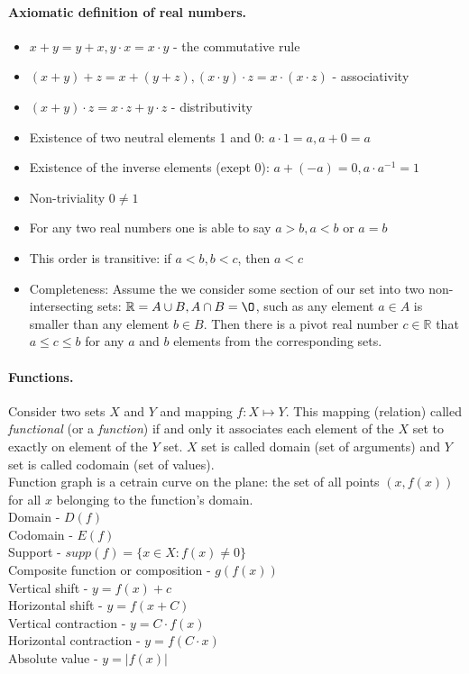 \documentclass{article}
\newcommand{\R}{\mathbb{R}}
\begin{document}
\paragraph{Axiomatic definition of real numbers.}
\begin{itemize}
    \item $x+y=y+x, y \cdot x = x \cdot y$ - the commutative rule
    \item $(x+y)+z = x + (y+z), (x \cdot y) \cdot z = x \cdot (x \cdot z)$ - associativity
    \item $(x+y) \cdot z = x \cdot z + y \cdot z$ - distributivity
    \item Existence of two neutral elements 1 and 0: $a \cdot 1 = a, a+0=a$
    \item Existence of the inverse elements (exept 0): $a + (-a)=0,a \cdot a^{-1}=1$
    \item Non-triviality $0 \neq 1$
    \item For any two real numbers one is able to say $a>b,a<b$ or $a=b$
    \item This order is transitive: if $a<b,b<c$, then $a<c$
    \item Completeness: Assume the we consider some section of our set into two non-intersecting sets: $ \R = A \cup B, A \cap B = \O$, such as any element $a \in A$ is smaller than any element $b \in B$. Then there is a pivot real number $c \in \R$ that $a \leq c \leq b$ for any $a$ and $b$ elements from the corresponding sets.
\end{itemize}

\paragraph{Functions.}
Consider two sets $X$ and $Y$ and mapping $f: X \mapsto Y$. This mapping (relation) called {\it functional} (or a {\it function}) if and only it associates each element of the 
$X$ set to exactly on element of the $Y$ set. $X$ set is called domain (set of arguments) and $Y$ set is called codomain (set of values).
\\
Function graph is a cetrain curve on the plane: the set of all points $(x,f(x))$ for all $x$ belonging to the function's domain.
\\
Domain - $D(f)$
\\
Codomain - $E(f)$
\\
Support - $supp(f) = \{x \in X : f(x) \neq 0\}$
\\
Composite function or composition - $g(f(x))$
\\
Vertical shift - $y = f(x) + c$
\\
Horizontal shift - $y=f(x+C)$
\\
Vertical contraction - $y=C \cdot f(x)$
\\
Horizontal contraction - $y=f(C \cdot x)$
\\
Absolute value - $y=|f(x)|$
\end{document}
